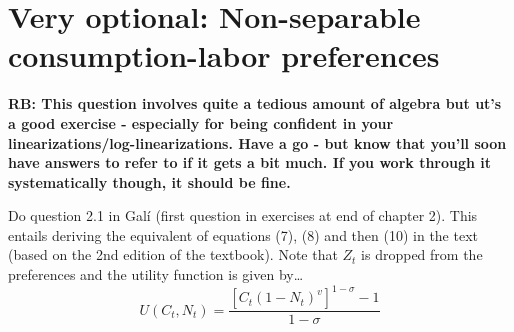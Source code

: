 \documentclass[authoryear,11pt]{elsarticle}
\begin{document}
%
%
%

\section{Very optional: Non-separable consumption-labor preferences}
\textbf{RB: This question involves quite a tedious amount of algebra but ut's a good exercise - especially for being confident in your linearizations/log-linearizations. Have a go - but know that you'll soon have answers to refer to if it gets a bit much. If you work through it systematically though, it should be fine.}

Do question 2.1 in Gal\'i (first question in exercises at end of chapter 2). This entails deriving the equivalent of equations (7), (8) and then (10) in the text (based on the 2nd edition of the textbook). Note that $Z_{t}$ is dropped from the preferences and the utility function is given by\ldots
\[
U(C_{t},N_{t}) = \frac{\left[ C_{t} \left( 1-N_{t} \right)^{v} \right]^{1-\sigma}-1}{1-\sigma}
\]
\end{document}
